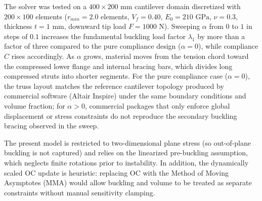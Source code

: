 \documentclass{article}
\begin{document}
The solver was tested on a $400 \times 200\text{ mm}$ cantilever domain discretized with $200 \times 100$ elements ($r_{min} = 2.0$ elements, $V_f = 0.40$, $E_0 = 210\text{ GPa}$, $\nu = 0.3$, thickness $t = 1\text{ mm}$, downward tip load $F = 1000\text{ N}$). Sweeping $\alpha$ from $0$ to $1$ in steps of $0.1$ increases the fundamental buckling load factor $\lambda_1$ by more than a factor of three compared to the pure compliance design ($\alpha = 0$), while compliance $C$ rises accordingly. As $\alpha$ grows, material moves from the tension chord toward the compressed lower flange and internal bracing bars, which divides long compressed struts into shorter segments. For the pure compliance case ($\alpha = 0$), the truss layout matches the reference cantilever topology produced by commercial software (Altair Inspire) under the same boundary conditions and volume fraction; for $\alpha > 0$, commercial packages that only enforce global displacement or stress constraints do not reproduce the secondary buckling bracing observed in the sweep.

The present model is restricted to two-dimensional plane stress (so out-of-plane buckling is not captured) and relies on the linearized pre-buckling assumption, which neglects finite rotations prior to instability. In addition, the dynamically scaled OC update is heuristic: replacing OC with the Method of Moving Asymptotes (MMA) would allow buckling and volume to be treated as separate constraints without manual sensitivity clamping.

\newpage
\end{document}
